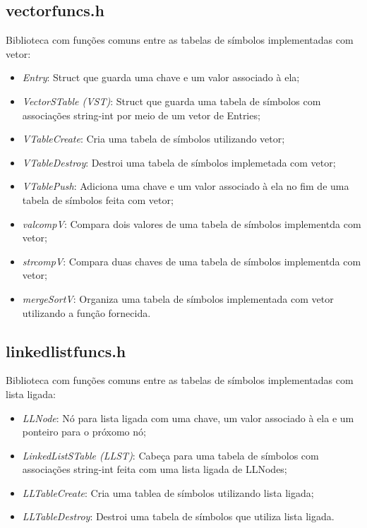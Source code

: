 \documentclass[12pt, a4paper]{article} %
\begin{document}
	\subsection{vectorfuncs.h}
	Biblioteca com funções comuns entre as tabelas de símbolos implementadas com 		vetor:
	\begin{itemize}
		\item \textit{Entry}: Struct que guarda uma chave e um valor associado à ela;
		\item \textit{VectorSTable (VST)}: Struct que guarda uma tabela de símbolos com associações string-int por meio de um vetor de Entries;
		\item \textit{VTableCreate}:  Cria uma tabela de símbolos utilizando vetor;
		\item \textit{VTableDestroy}: Destroi uma tabela de símbolos implemetada com vetor;
		\item \textit{VTablePush}: Adiciona uma chave e um valor associado à ela no fim de uma tabela de símbolos feita com vetor;
		\item \textit{valcompV}: Compara dois valores de uma tabela de símbolos implementda com vetor;
		\item \textit{strcompV}: Compara duas chaves de uma tabela de símbolos implementda com vetor;
		\item \textit{mergeSortV}: Organiza uma tabela de símbolos implementada com vetor utilizando a função fornecida.
	\end{itemize}

	\subsection{linkedlistfuncs.h}
	Biblioteca com funções comuns entre as tabelas de símbolos implementadas com lista ligada:
	\begin{itemize}
		\item \textit{LLNode}: Nó para lista ligada com uma chave, um valor associado à ela e um ponteiro para o próxomo nó;
		\item \textit{LinkedListSTable (LLST)}: Cabeça para uma tabela de símbolos com associações string-int feita com uma lista ligada de LLNodes;
		\item \textit{LLTableCreate}: Cria uma tablea de símbolos utilizando lista ligada;
		\item \textit{LLTableDestroy}: Destroi uma tabela de símbolos que utiliza lista ligada.
	\end{itemize}
\end{document}
